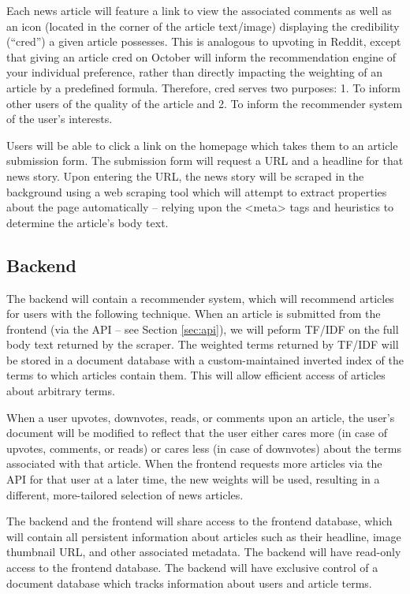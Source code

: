 \documentclass[11pt,letterpaper]{article}
\begin{document}
Each news article will feature a link to view the associated comments as well as an icon (located in the corner of the article text/image) displaying the credibility (``cred'') a given article possesses.
This is analogous to upvoting in Reddit, except that giving an article cred on October will inform the recommendation engine of your individual preference, rather than directly impacting the weighting of an article by a predefined formula. Therefore, cred serves two purposes: 1. To inform other users of the quality of the article and 2. To inform the recommender system of the user's interests.

Users will be able to click a link on the homepage which takes them to an article submission form.
The submission form will request a URL and a headline for that news story.
Upon entering the URL, the news story will be scraped in the background using a web scraping tool which will attempt to extract properties about the page automatically -- relying upon the <meta> tags and heuristics to determine the article's body text.

\subsection{Backend}
The backend will contain a recommender system, which will recommend articles for users with the following technique.
When an article is submitted from the frontend (via the API -- see Section \ref{sec:api}), we will peform TF/IDF\cite{tfidf} on the full body text returned by the scraper.
The weighted terms returned by TF/IDF will be stored in a document database with a custom-maintained inverted index of the terms to which articles contain them.
This will allow efficient access of articles about arbitrary terms.

When a user upvotes, downvotes, reads, or comments upon an article, the user's document will be modified to reflect that the user either cares more (in case of upvotes, comments, or reads) or cares less (in case of downvotes) about the terms associated with that article.
When the frontend requests more articles via the API for that user at a later time, the new weights will be used, resulting in a different, more-tailored selection of news articles.

The backend and the frontend will share access to the frontend database, which will contain all persistent information about articles such as their headline, image thumbnail URL, and other associated metadata.
The backend will have read-only access to the frontend database.
The backend will have exclusive control of a document database which tracks information about users and article terms.
\end{document}
